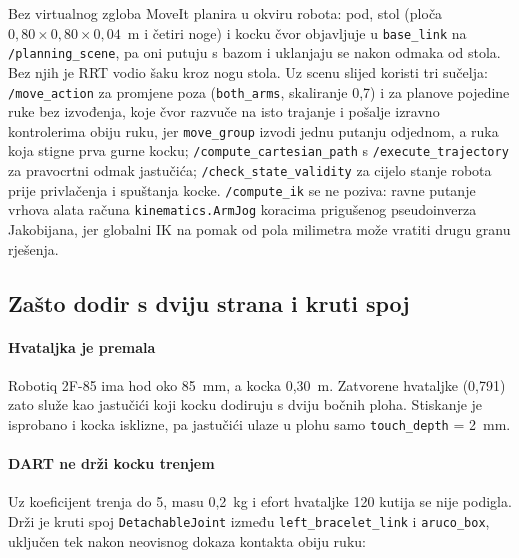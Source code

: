Bez virtualnog zgloba MoveIt planira u okviru robota: pod, stol (ploča $0{,}80 \times 0{,}80 \times
0{,}04$~m i četiri noge) i kocku čvor objavljuje u \texttt{base\_link} na \texttt{/planning\_scene}, pa
oni putuju s bazom i uklanjaju se nakon odmaka od stola. Bez njih je RRT vodio šaku kroz nogu stola.
Uz scenu slijed koristi tri sučelja: \texttt{/move\_action} za promjene poza (\texttt{both\_arms}, skaliranje
0{,}7) i za planove pojedine ruke bez izvođenja, koje čvor razvuče na isto trajanje i pošalje izravno
kontrolerima obiju ruku, jer \texttt{move\_group} izvodi jednu putanju odjednom, a ruka koja stigne
prva gurne kocku; \texttt{/compute\_cartesian\_path} s \texttt{/execute\_trajectory} za pravocrtni
odmak jastučića; \texttt{/check\_state\_validity} za cijelo stanje robota prije privlačenja i spuštanja
kocke. \texttt{/compute\_ik} se ne poziva: ravne putanje vrhova alata računa \texttt{kinematics.ArmJog}
koracima prigušenog pseudoinverza Jakobijana, jer globalni IK na pomak od pola milimetra može vratiti
drugu granu rješenja.

\subsection{Zašto dodir s dviju strana i kruti spoj}
\label{sec:07-zasto}

\paragraph{Hvataljka je premala} Robotiq 2F-85 ima hod oko 85~mm, a kocka 0{,}30~m. Zatvorene
hvataljke (0{,}791) zato služe kao jastučići koji kocku dodiruju s dviju bočnih ploha. Stiskanje je
isprobano i kocka isklizne, pa jastučići ulaze u plohu samo \texttt{touch\_depth} = 2~mm.

\paragraph{DART ne drži kocku trenjem} Uz koeficijent trenja do 5, masu 0{,}2~kg i efort hvataljke 120 kutija se nije
podigla. Drži je kruti spoj \texttt{DetachableJoint} između \texttt{left\_bracelet\_link} i
\texttt{aruco\_box}, uključen tek nakon neovisnog dokaza kontakta obiju ruku:

